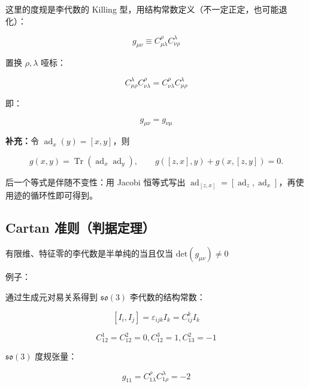 这里的度规是李代数的 Killing 型，用结构常数定义（不一定正定，也可能退化）：

\begin{equation}
g_{\mu\nu}
\equiv C_{\mu\lambda}^\rho C_{\nu\rho}^\lambda
\end{equation}

置换 $\rho,\lambda$ 哑标：

\begin{equation}
C_{\mu\rho}^\lambda C_{\nu \lambda}^\rho
=C_{\nu \lambda}^\rho C_{\mu\rho}^\lambda
\end{equation}

即：

\begin{equation}
g_{\mu\nu} = g_{\nu\mu}
\end{equation}

\textbf{补充：}令 $\operatorname{ad}_x\left(y\right)=\left[x,y\right]$，则

\begin{equation}
g\left(x,y\right)=\operatorname{Tr}\left(\operatorname{ad}_x\operatorname{ad}_y\right),\qquad
g\left(\left[z,x\right],y\right)+g\left(x,\left[z,y\right]\right)=0.
\end{equation}

后一个等式是伴随不变性：用 Jacobi 恒等式写出 $\operatorname{ad}_{\left[z,x\right]}=\left[\operatorname{ad}_z,\operatorname{ad}_x\right]$，再使用迹的循环性即可得到。

\subsection{Cartan 准则（判据定理）}

有限维、特征零的李代数是半单纯的当且仅当 $\mathrm{det}\left(g_{\mu\nu} \right)\ne 0$

例子：

通过生成元对易关系得到 $\mathfrak{so}\left(3\right)$ 李代数的结构常数：

\begin{equation}
\left[I_i,I_j \right]=\varepsilon_{ijk}I_k=C_{ij}^k I_k
\end{equation}

\begin{equation}
C_{12}^1=C_{12}^2=0,C_{12}^3=1,C_{13}^2=-1
\end{equation}

$\mathfrak{so}\left(3\right)$ 度规张量：

\begin{equation}
g_{11}
=C_{1\lambda}^\rho C_{1\rho}^\lambda
=-2
\end{equation}


